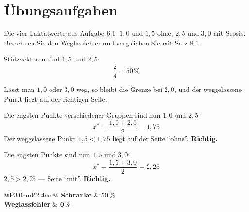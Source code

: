 \section{Übungsaufgaben}

\begin{aufgabe}
Die vier Laktatwerte aus Aufgabe 6.1: $1{,}0$ und $1{,}5$ ohne, $2{,}5$ und $3{,}0$ mit Sepsis. Berechnen Sie den Weglassfehler und vergleichen Sie mit Satz 8.1.

\loesung
{}
Stützvektoren sind $1{,}5$ und $2{,}5$:
\[ \frac{2}{4} = 50\,\% \]

Lässt man $1{,}0$ oder $3{,}0$ weg, so bleibt die Grenze bei $2{,}0$, und der weggelassene Punkt liegt auf der richtigen Seite. \checkmark

Die engsten Punkte verschiedener Gruppen sind nun $1{,}0$ und $2{,}5$:
\[ x^{*} = \frac{1{,}0+2{,}5}{2} = 1{,}75 \]
Der weggelassene Punkt $1{,}5 < 1{,}75$ liegt auf der Seite \enquote{ohne}. \textbf{Richtig.}

Die engsten Punkte sind nun $1{,}5$ und $3{,}0$:
\[ x^{*} = \frac{1{,}5+3{,}0}{2} = 2{,}25 \]
$2{,}5 > 2{,}25$ --- Seite \enquote{mit}. \textbf{Richtig.}

\begin{center}
{\small
\renewcommand{\arraystretch}{1.5}
\begin{tabular}{@{}P{3.0cm}P{2.4cm}@{}}
\toprule
\textbf{Schranke} & $50\,\%$\\
\textbf{Weglassfehler} & $\mathbf{0\,\%}$\\
\bottomrule
\end{tabular}}
\end{center}

\begin{center}
\begin{minipage}{0.88\textwidth}
\end{minipage}
\end{center}
\end{aufgabe}

